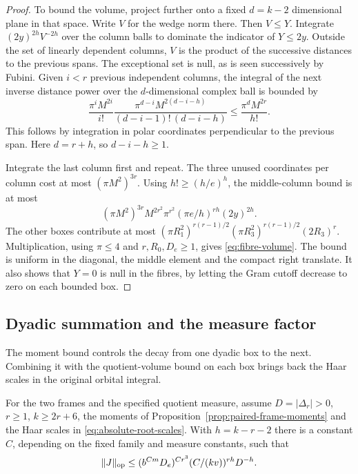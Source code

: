 \begin{proof}
To bound the volume, project further onto a fixed
\(d=k-2\) dimensional plane in that space. Write \(V\) for
the wedge norm there. Then \(V\le Y\). Integrate
\((2y)^{2h}V^{-2h}\) over the column balls to dominate the
indicator of \(Y\le2y\). Outside the set of linearly dependent
columns, \(V\) is the product of the successive distances
to the previous spans. The exceptional set is null, as is seen
successively by Fubini. Given \(i<r\) previous independent
columns, the integral of the next inverse distance power over
the \(d\)-dimensional complex ball is bounded by
\[
 \frac{\pi^iM^{2i}}{i!}
 \frac{\pi^{d-i} M^{2(d-i-h)}}{(d-i-1)!\,(d-i-h)}
 \le \frac{\pi^d M^{2r}}{h!}.
\]
This follows by integration in polar coordinates perpendicular
to the previous span. Here \(d=r+h\), so \(d-i-h\ge1\).

Integrate the last column first and repeat. The three unused
coordinates per column cost at most \((\pi M^2)^{3r}\).
Using \(h!\ge(h/e)^h\), the middle-column bound is at most
\[
 (\pi M^2)^{3r}M^{2r^2}\pi^{r^2}
                  (\pi e/h)^{rh}(2y)^{2h}.
\]
The other boxes contribute at most
\((\pi R_1^2)^{r(r-1)/2}(\pi R_3^2)^{r(r-1)/2}(2R_3)^r\).
Multiplication, using \(\pi\le4\) and \(r,R_0,D_e\ge1\),
gives \eqref{eq:fibre-volume}. The bound is uniform in the
diagonal, the middle element and the compact right translate.
It also shows that \(Y=0\) is null in the fibres, by letting
the Gram cutoff decrease to zero on each bounded box.

\end{proof}

\subsection{Dyadic summation and the measure factor}

The moment bound controls the decay from one dyadic box to the next. Combining it with the quotient-volume bound on each box brings back the Haar scales in the original orbital integral.

\begin{proposition}\label{prop:absolute-cell-operator}
For the two frames and the specified quotient measure, assume
\(D=|\Delta_r|>0\), \(r\ge1\), \(k\ge2r+6\),
the moments of Proposition~\ref{prop:paired-frame-moments}
and the Haar scales in \eqref{eq:absolute-root-scales}. With \(h=k-r-2\) there is a constant
\(C\), depending on the fixed family and measure constants, such that
\[
 \|J\|_{\rm op}\le (b^{Cm}D_e)^{Cr^3}
                (C/(kv))^{rh}D^{-h}.
\]
\end{proposition}

